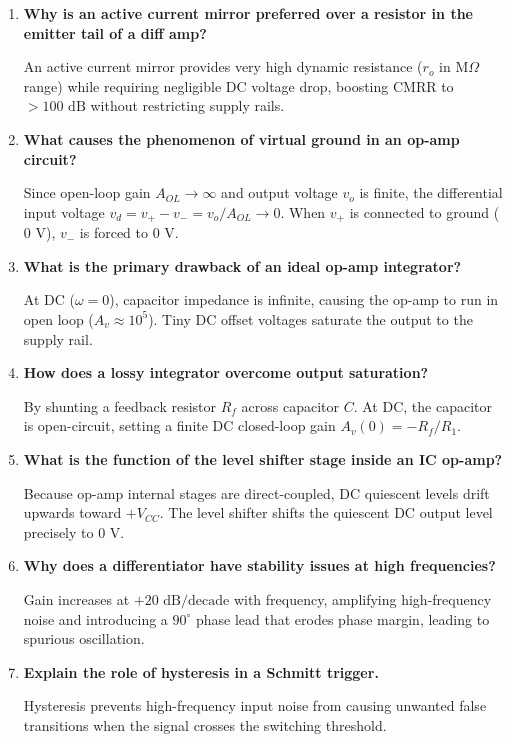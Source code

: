 \documentclass[12pt,a4paper]{article}
\newcommand{\Q}[1]{\textbf{#1}\par\noindent\ignorespaces}
\begin{document}
\begin{tcolorbox}[exambox, title={Frequently Asked / Viva Questions}]
\begin{enumerate}[topsep=0pt, label=\textbf{Q\arabic*.}, itemsep=5pt]
  \item \Q{Why is an active current mirror preferred over a resistor in the emitter tail of a diff amp?}
  An active current mirror provides very high dynamic resistance ($r_o$ in M$\Omega$ range) while requiring negligible DC voltage drop, boosting CMRR to $> 100\text{ dB}$ without restricting supply rails.

  \item \Q{What causes the phenomenon of virtual ground in an op-amp circuit?}
  Since open-loop gain $A_{OL} \to \infty$ and output voltage $v_o$ is finite, the differential input voltage $v_d = v_+ - v_- = v_o / A_{OL} \to 0$. When $v_+$ is connected to ground ($0\text{ V}$), $v_-$ is forced to $0\text{ V}$.

  \item \Q{What is the primary drawback of an ideal op-amp integrator?}
  At DC ($\omega = 0$), capacitor impedance is infinite, causing the op-amp to run in open loop ($A_v \approx 10^5$). Tiny DC offset voltages saturate the output to the supply rail.

  \item \Q{How does a lossy integrator overcome output saturation?}
  By shunting a feedback resistor $R_f$ across capacitor $C$. At DC, the capacitor is open-circuit, setting a finite DC closed-loop gain $A_v(0) = -R_f/R_1$.

  \item \Q{What is the function of the level shifter stage inside an IC op-amp?}
  Because op-amp internal stages are direct-coupled, DC quiescent levels drift upwards toward $+V_{CC}$. The level shifter shifts the quiescent DC output level precisely to $0\text{ V}$.

  \item \Q{Why does a differentiator have stability issues at high frequencies?}
  Gain increases at $+20\text{ dB/decade}$ with frequency, amplifying high-frequency noise and introducing a $90^\circ$ phase lead that erodes phase margin, leading to spurious oscillation.

  \item \Q{Explain the role of hysteresis in a Schmitt trigger.}
  Hysteresis prevents high-frequency input noise from causing unwanted false transitions when the signal crosses the switching threshold.


\end{enumerate}
\end{tcolorbox}
\end{document}
